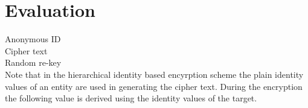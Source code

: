 \section{Evaluation}
Anonymous ID\\
Cipher text\\
Random re-key\\
Note that in the hierarchical identity based encyrption scheme \cite{BBG05} the plain identity values of an entity are used in generating the cipher text. During the encryption the following value is derived using the identity values of the target.

